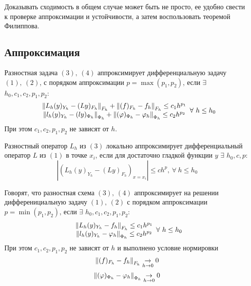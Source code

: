 Доказывать сходимость в общем случае может быть не просто, ее удобно свести
к проверке аппроксимации и устойчивости, а затем воспользовать теоремой Филиппова.

\subsection*{Аппроксимация}

\begin{definition}
  Разностная задача $(3),\ (4)$ аппроксимирует дифференциальную задачу $(1),\ (2)$,
  с порядком аппроксимации $p=\max(p_1,p_2)$, если $\exists$ $h_0,c_1,c_2,p_1,p_2$:
  \[\begin{array}{c}
      \left\lVert L_h(y)_{Y_h} - (Ly)_{F_h}\right\rVert_{F_h}+\left\lVert(f)_{F_h}-f_h\right\rVert_{F_h}\leq c_1h^{p_1} \\
      \left\lVert l_h(y)_{Y_h} - (ly)_{\Phi_h}\right\rVert_{\Phi_h}+\left\lVert(\varphi)_{\Phi_h}-\varphi_h\right\rVert_{\Phi_h}\leq c_2h^{p_2}
    \end{array}\forall\ h\leq h_0\]
  При этом $c_1,c_2,p_1,p_2$ не зависят от $h$.
\end{definition}

\begin{definition}
  Разностный оператор $L_h$ из $(3)$ локально аппроксимирует дифференциальный
  оператор $L$ из $(1)$ в точке $x_i$, если для достаточно
  гладкой функции $y$ $\exists$ $h_0,c,p$:
  \[|(L_h(y)_{Y_h} - (Ly)_{F_h})_{x=x_i}|\leq ch^p,\ \forall\ h\leq h_0\]
\end{definition}

\begin{definition}
  Говорят, что разностная схема $(3),\ (4)$ аппроксимирует на решении
  дифференициальную задачу $(1),\ (2)$ с порядком аппроксимации $p=\min(p_1,p_2)$,
  если $\exists$ $h_0,c_1,c_2,p_1,p_2$:
  \[\begin{array}{c}
      \left\lVert L_h(y)_{Y_h}-f_h\right\rVert_{F_h}\leq c_1h^{p_1} \\
      \left\lVert l_h(y)_{Y_h}-\varphi_h\right\rVert_{\Phi_h}\leq c_2h^{p_2}
    \end{array}\forall\ h\leq h_0\]
  При этом $c_1,c_2,p_1,p_2$ не зависят от $h$ и выполнено условие нормировки
  \[\left\lVert(f)_{F_h}-f_h\right\rVert_{F_h}\underset{h\rightarrow0}{\rightarrow}0\]
  \[\left\lVert(\varphi)_{\Phi_h}-\varphi_h\right\rVert_{\Phi_h}\underset{h\rightarrow0}{\rightarrow}0\]
\end{definition}

